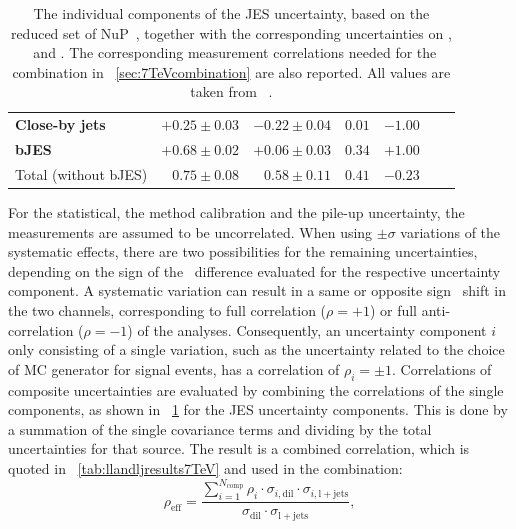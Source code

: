 \begin{table}[hp!]
\begin{center}
\begin{tabular}{|l|r|r|r|r|r|r|}
\textbf{Close-by jets}                              &\boldmath$+0.25 \pm 0.03$ &\boldmath$-0.22 \pm 0.04$ &\boldmath$0.01$  &\boldmath$-1.00$ \\
\textbf{\gls{bJES}}                                 &\boldmath$+0.68 \pm 0.02$ &\boldmath$+0.06 \pm 0.03$ &\boldmath$0.34$  &\boldmath$+1.00$ \\ \hline
   Total (without \gls{bJES})                       &         $ 0.75 \pm 0.08$ &         $ 0.58 \pm 0.11$ &         $0.41$  &         $-0.23$ \\ \hline
\end{tabular}
\end{center}
\caption[\gls{JES} components for the $\sqrts=7$~\TeV\ analyses]{
%
The individual components of the \gls{JES} uncertainty, based on the reduced set of \gls{NuP}~\cite{ATLASCollaboration2015b}, together with the corresponding uncertainties on \mtdl, \mtlj\ and \mtcb.
%
The corresponding measurement correlations needed for the combination in \sect~\ref{sec:7TeVcombination} are also reported.
%
All values are taken from ~\cite{Aad:2015nba}.
%
\label{tab:jesresults7TeV}
}
\end{table}
%
For the statistical, the method calibration and the pile-up uncertainty, the measurements are assumed to be uncorrelated. 
%
When using $\pm \sigma$ variations of the systematic effects, there are two possibilities for the remaining uncertainties, depending on the sign of the \mt\ difference evaluated for the respective uncertainty component. A systematic variation can result in a same or opposite sign \mt\ shift in the two channels, corresponding to full correlation ($\rho=+1$) or full anti-correlation ($\rho=-1$) of the analyses. 
%
Consequently, an uncertainty component $i$ only consisting of a single variation, such as the uncertainty related to the choice of MC generator for signal events, has a correlation of $\rho_i=\pm1$. 
%
Correlations of composite uncertainties are evaluated by combining the correlations of the single components, as shown in \tab~\ref{tab:jesresults7TeV} for the \gls{JES} uncertainty components. 
%
This is done by a summation of the single covariance terms and dividing by the total uncertainties for that source. The result is a combined correlation, which is quoted in \tab~\ref{tab:llandljresults7TeV} and used in the combination:
%
\[
\rho_\mathrm{eff}=\frac
{\sum_{i=1}^{N_\mathrm{comp}} \rho_i \cdot \sigma_{i,\mathrm{dil}} \cdot \sigma_{i,\mathrm{l+jets}}}
{\sigma_\mathrm{dil} \cdot \sigma_\mathrm{l+jets}},
\]
